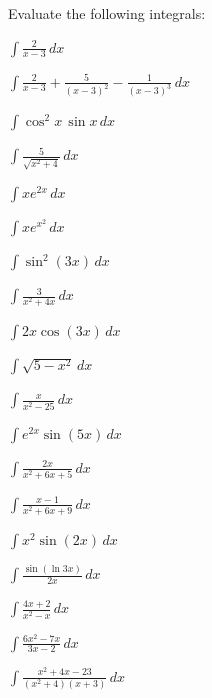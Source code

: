 \documentclass[12pt]{exam}
\begin{document}
Evaluate the following integrals:
\begin{questions}
\question  $\displaystyle \int \frac{2}{x-3}    \, dx$
\vspace{.5in}

\question $\displaystyle \int \frac{2}{x-3} + \frac {5}{(x-3)^2} 
- \frac{1}{(x-3)^3}    \, dx$
\vspace{.5in}

\question $\displaystyle \int  \cos^2 x \, \sin x \, dx$
\vspace{3in}

\question $\displaystyle \int \frac{5}{\sqrt{x^2 +4}} \, dx$
\clearpage

\question $\int x e^{2x} \, dx$
\vspace{3in}

\question $\int x e^{x^2} \, dx$
\vspace{3in}


\question $\int \sin^2(3x)\, dx$
\clearpage

\question $\displaystyle \int  \frac{3}{x^2+4x} \, dx$
\vspace{5in}

\question $\displaystyle \int  2x\cos(3x) \, dx$
\vspace{5in}

\question $\displaystyle \int   \sqrt{5-x^2} \, dx$
\vspace{5in}

\question $\displaystyle \int \frac{x}{x^2-25}\, dx$
\vspace{5in}

\question $\displaystyle \int e^{2x} \sin(5x)\, dx$
\vspace{5in}

\question $\displaystyle \int   \frac{2x}{x^2+6x+5} \, dx$
\vspace{5in}

\question $\displaystyle \int  \frac{x-1}{x^2+6x+9} \, dx$
\vspace{5in}

\question $\displaystyle \int  x^2 \sin(2x) \, dx$
\vspace{5in}

\question $\displaystyle \int   \frac{\sin(\ln 3x)}{2x} \, dx$
\vspace{5in}

\question $\displaystyle \int   \frac{4x+2}{x^2-x} \, dx$
\vspace{5in}

\question $\displaystyle \int   \frac{6x^2-7x}{3x-2} \, dx$
\vspace{5in}

\question $\displaystyle \int   \frac{x^2+4x-23}{(x^2+4)(x+3)} \, dx$
\vspace{5in}

\end{questions}
\end{document}
